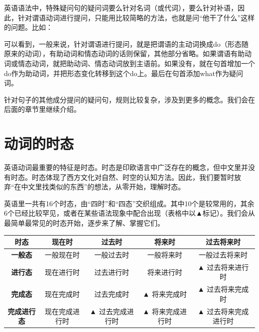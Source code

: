 \documentclass[10.5pt, a4paper]{ctexbook} %
\begin{document}
\begin{liju}
\end{liju}

英语语法中，特殊疑问句的疑问词要么针对名词（或代词），要么针对补语，因此，针对谓语动词进行提问，只能用比较简略的方法，也就是问“他干了什么”这样的问题。比如：

\begin{liju}
\end{liju}

可以看到，一般来说，针对谓语进行提问，就是把谓语的主动词换成do（形态随原来的动词），有助动词和情态动词的话则保留，其他部分省略。如果谓语有助动词或情态动词，就把助动词、情态动词放到主语前。如果没有，就在句首增加一个do作为助动词，并把形态变化转移到这个do上。最后在句首添加what作为疑问词。

针对句子的其他成分提问的疑问句，规则比较复杂，涉及到更多的概念。我们会在后面的章节里继续介绍。

\section{动词的时态}

英语动词最重要的特征是时态。时态是印欧语言中广泛存在的概念，但中文里并没有时态。时态体现了西方文化对自然、时空的认知方法。因此，我们要暂时放弃“在中文里找类似的东西”的想法，从零开始，理解时态。

英语里一共有16个时态，由“四时”和“四态”交织组成。其中10个是较常用的，其余6个已经比较罕见，或者在某些语法现象中配合出现（表格中以▲标记）。我们会从最简单最常见的时态开始，逐步来了解、掌握它们。

\vspace{8pt}
\begin{tabular}{|c|c|c|c|c|}
\hline
\textbf{时态} & \textbf{现在时} & \textbf{过去时} & \textbf{将来时} & \textbf{过去将来时} \\
\hline
\textbf{一般态} & 一般现在时 & 一般过去时 & 一般将来时 & 一般过去将来时 \\
\hline
\textbf{进行态} & 现在进行时 & 过去进行时 & 将来进行时 & ▲ 过去将来进行时 \\
\hline
\textbf{完成态} & 现在完成时 & 过去完成时 & ▲ 将来完成时 & ▲ 过去将来完成时 \\
\hline
\textbf{完成进行态} & 现在完成进行时 & ▲ 过去完成进行时 & ▲ 将来完成进行时 & ▲ 过去将来完成进行时 \\
\hline
\end{tabular}
\end{document}
